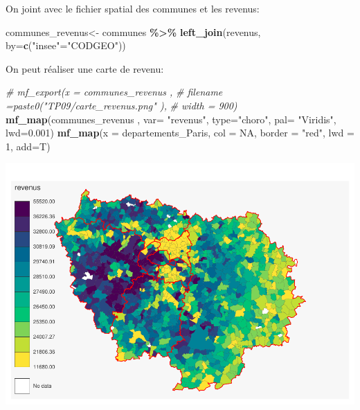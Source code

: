 \documentclass[
]{book}
\newenvironment{Shaded}{\begin{snugshade}}{\end{snugshade}}
\newcommand{\AttributeTok}[1]{\textcolor[rgb]{0.13,0.29,0.53}{#1}}
\newcommand{\CommentTok}[1]{\textcolor[rgb]{0.56,0.35,0.01}{\textit{#1}}}
\newcommand{\ConstantTok}[1]{\textcolor[rgb]{0.56,0.35,0.01}{#1}}
\newcommand{\DecValTok}[1]{\textcolor[rgb]{0.00,0.00,0.81}{#1}}
\newcommand{\FloatTok}[1]{\textcolor[rgb]{0.00,0.00,0.81}{#1}}
\newcommand{\FunctionTok}[1]{\textcolor[rgb]{0.13,0.29,0.53}{\textbf{#1}}}
\newcommand{\NormalTok}[1]{#1}
\newcommand{\OtherTok}[1]{\textcolor[rgb]{0.56,0.35,0.01}{#1}}
\newcommand{\SpecialCharTok}[1]{\textcolor[rgb]{0.81,0.36,0.00}{\textbf{#1}}}
\newcommand{\StringTok}[1]{\textcolor[rgb]{0.31,0.60,0.02}{#1}}
\begin{document}
On joint avec le fichier spatial des communes et les revenus:

\begin{Shaded}
\begin{Highlighting}[]
\NormalTok{communes\_revenus}\OtherTok{\textless{}{-}}\NormalTok{ communes }\SpecialCharTok{\%\textgreater{}\%}
  \FunctionTok{left\_join}\NormalTok{(revenus, }\AttributeTok{by=}\FunctionTok{c}\NormalTok{(}\StringTok{"insee"}\OtherTok{=}\StringTok{"CODGEO"}\NormalTok{))}
\end{Highlighting}
\end{Shaded}

On peut réaliser une carte de revenu:

\begin{Shaded}
\begin{Highlighting}[]
\CommentTok{\# mf\_export(x = communes\_revenus ,}
\CommentTok{\#           filename =paste0("TP09/carte\_revenus.png" ),}
\CommentTok{\#           width = 900)}
\FunctionTok{mf\_map}\NormalTok{(communes\_revenus ,}
       \AttributeTok{var=} \StringTok{"revenus"}\NormalTok{,}
       \AttributeTok{type=}\StringTok{"choro"}\NormalTok{,}
       \AttributeTok{pal=} \StringTok{"Viridis"}\NormalTok{,}
       \AttributeTok{lwd=}\FloatTok{0.001}\NormalTok{)}
\FunctionTok{mf\_map}\NormalTok{(}\AttributeTok{x =}\NormalTok{ departements\_Paris, }\AttributeTok{col =} \ConstantTok{NA}\NormalTok{, }\AttributeTok{border =} \StringTok{"red"}\NormalTok{, }\AttributeTok{lwd =} \DecValTok{1}\NormalTok{, }\AttributeTok{add=}\NormalTok{T)}
\end{Highlighting}
\end{Shaded}

\includegraphics{bookdown-demo_files/figure-latex/unnamed-chunk-83-1.pdf}
\end{document}
